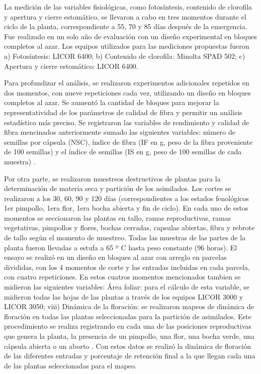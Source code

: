 \documentclass[12pt,oneside]{reedthesis}
\begin{document}
La medición de las variables fisiológicas, como fotosíntesis, contenido de clorofila y apertura y cierre estomático, se llevaron a cabo en tres momentos durante el ciclo de la planta, correspondiente a 55, 70 y 85 días después de la emergencia. Fue realizado en un solo año de evaluación con un diseño experimental en bloques completos al azar. Los equipos utilizados para las mediciones propuestas fueron a) Fotosíntesis: LICOR 6400; b) Contenido de clorofila: Minolta SPAD 502; c) Apertura y cierre estomático: LICOR 6400.

Para profundizar el análisis, se realizaron experimentos adicionales repetidos en dos momentos, con nueve repeticiones cada vez, utilizando un diseño en bloques completos al azar. Se aumentó la cantidad de bloques para mejorar la representatividad de los parámetros de calidad de fibra y permitir un análisis estadístico más preciso. Se registraron las variables de rendimiento y calidad de fibra mencinados anteriormente sumado las siguientes variables: número de semillas por cápsula (NSC)\autocite{worley1974}, índice de fibra (IF en g, peso de la fibra proveniente de 100 semillas) y el índice de semillas (IS en g, peso de 100 semillas de cada muestra) \autocite{pettigrew2013}.

Por otra parte, se realizaron muestreos destructivos de plantas para la determinación de materia seca y partición de los asimilados. Los cortes se realizaron a los 30, 60, 90 y 120 días (correspondientes a los estados fenológicos 1er pimpollo, 1era flor, 1era bocha abierta y fin de ciclo). En cada uno de estos momentos se seccionaron las plantas en tallo, ramas reproductivas, ramas vegetativas, pimpollos y flores, bochas cerradas, capsulas abiertas, fibra y rebrote de tallo según el momento de muestreo. Todas las muestras de las partes de la planta fueron llevadas a estufa a 65 º C hasta peso constante (96 horas). El ensayo se realizó en un diseño en bloques al azar con arreglo en parcelas divididas, con los 4 momentos de corte y las entradas incluidas en cada parcela, con cuatro repeticiones. En estos cuatros momentos mencionados tambien se midieron las siguientes variables: Área foliar: para el cálculo de esta variable, se midieron todas las hojas de las plantas a través de los equipos LICOR 3000 y LICOR 3050; viii) Dinámica de la floración: se realizaron mapeos de dinámica de floración en todas las plantas seleccionadas para la partición de asimilados. Este procedimiento se realiza registrando en cada una de las posiciones reproductivas que genera la planta, la presencia de un pimpollo, una flor, una bocha verde, una cápsula abierta o un aborto \autocite{kerby1996monitoring}. Con estos datos se realizó la dinámica de floración de las diferentes entradas y porcentaje de retención final a la que llegan cada una de las plantas seleccionadas para el mapeo.
\end{document}
